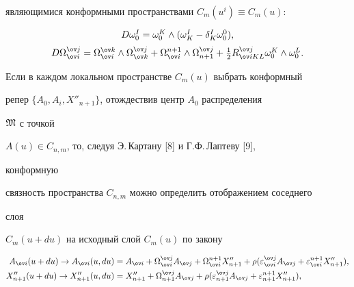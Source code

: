 являющимися конформными пространствами $C_m(u^i)\equiv C_m(u)$: 


\begin{equation} 


\begin{array}{c} 


D\omega^I_0=\omega^K_0\wedge(\omega^I_K-\delta^I_K\omega^0_0),\\[2mm] 


D\Omega^{\ov j}_{\ov i}=\Omega^{\ov k}_{\ov i}\wedge 


\Omega^{\ov j}_{\ov k}+\Omega^{n+1}_{\ov i}\wedge 


\Omega^{\ov j}_{n+1}+\frac{1}{2}R^{\ov j}_{\ov i K L} 


\omega^K_0\wedge\omega^L_0. 


\end{array} 


\end{equation} 


 


Если в каждом локальном пространстве $C_m(u)$ выбрать конформный 


репер $\{A_0,A_i,X''_{n+1}\}$, отождествив центр $A_0$ распределения 


$\frak M$ с точкой 


$A(u)\in C_{n,m}$, то, следуя Э.\,Картану [8] и Г.Ф.\,Лаптеву [9], 


конформную 


связность пространства $C_{n,m}$ можно определить отображением соседнего 


слоя 


$C_m(u+d u)$ на исходный слой $C_m(u)$ по закону 


\begin{align*} 


A_{\ov i}(u +d u)\to A_{\ov i}(u,d u)&= A_{\ov i}+ 


\Omega^{\ov j}_{\ov i}A_{\ov j}+\Omega^{n+1}_{\ov i} 


X''_{n+1}+\rho(\varepsilon^{\ov j}_{\ov i}A_{\ov j}+ 


\varepsilon^{n+1}_{\ov i}X''_{n+1}),\\ 


% 


X''_{n+1}(u+d u)\to X''_{n+1}(u,d u)&=X''_{n+1}+ 


\Omega^{\ov j}_{n+1}A_{\ov j}+\rho(\varepsilon^{\ov j}_{n+1} 


A_{\ov j}+\varepsilon^{n+1}_{n+1}X''_{n+1}), 


\end{align*} 



